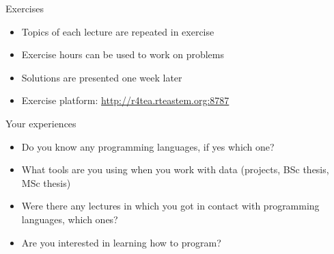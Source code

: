 \documentclass[ignorenonframetext,]{beamer}
\providecommand{\tightlist}{%
  \setlength{\itemsep}{0pt}\setlength{\parskip}{0pt}}
\begin{document}
\begin{frame}{Exercises}
\protect\hypertarget{exercises}{}

\begin{itemize}
\tightlist
\item
  Topics of each lecture are repeated in exercise
\item
  Exercise hours can be used to work on problems
\item
  Solutions are presented one week later
\item
  Exercise platform: \url{http://r4tea.rteastem.org:8787}
\end{itemize}


\end{frame}

\begin{frame}{Your experiences}
\protect\hypertarget{your-experiences}{}

\begin{itemize}
\tightlist
\item
  Do you know any programming languages, if yes which one?
\item
  What tools are you using when you work with data (projects, BSc
  thesis, MSc thesis)
\item
  Were there any lectures in which you got in contact with programming
  languages, which ones?
\item
  Are you interested in learning how to program?
\end{itemize}


\end{frame}
\end{document}
